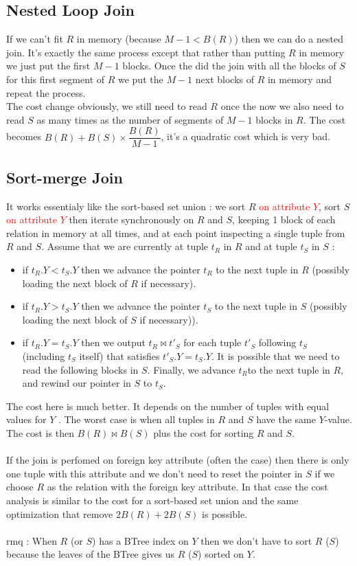 \documentclass[12pt,a4paper]{article}
\begin{document}
\subsection{Nested Loop Join}
If we can't fit $R$ in memory (because $M-1 < B(R)$) then we can do a nested join. It's exactly the same process except that rather than putting $R$ in memory we just put the first $M-1$ blocks. Once the did the join with all the blocks of $S$ for this first segment of $R$ we put the $M-1$ next blocks of $R$ in memory and repeat the process.\\
The cost change obviously, we still need to read $R$ once the now we also need to read $S$ as many times as the number of segments of $M-1$ blocks in $R$. The cost becomes $B(R) + B(S) \times \dfrac{B(R)}{M-1}$, it's a quadratic cost which is very bad.

\subsection{Sort-merge Join}
It works essentialy like the sort-based set union : we sort $R$ \textcolor{red}{on attribute $Y$}, sort $S$ \textcolor{red}{on attribute $Y$} then iterate synchronously on $R$ and $S$, keeping 1 block of each relation in memory at all times, and at each point inspecting a single tuple from $R$ and $S$. 
Assume that we are currently at tuple $t_R$ in $R$ and at tuple $t_S$ in $S$ : 
\begin{itemize}
\item if $t_R.Y < t_S.Y$ then we advance the pointer $t_R$ to the next tuple in $R$ (possibly loading the next block of $R$ if necessary).
\item if $t_R.Y > t_S.Y$ then we advance the pointer $t_S$ to the next tuple in $S$ (possibly loading the next block of $S$ if necessary)).
\item if $t_R.Y = t_S.Y$ then we output $t_R \Join t'_S$ for each tuple $t'_S$ following $t_S$ (including $t_S$ itself) that satisfies $t'_S.Y = t_S.Y$. It is possible that we need to read the following blocks in $S$. Finally, we advance $t_R $to the next tuple in $R$, and rewind our pointer in $S$ to $t_S$.
\end{itemize}
The cost here is much better. It depends on the number of tuples with equal values for $Y$ . The worst case is when all tuples in $R$ and $S$ have the same $Y $-value. The cost is then $B(R) \Join B(S)$ plus the cost for sorting $R$ and $S$.\\
\\
If the join is perfomed on foreign key attribute (often the case) then there is only one tuple with this attribute and we don't need to reset the pointer in $S$ if we choose $R$ as the relation with the foreign key attribute. In that case the cost analysis is similar to the cost for a sort-based set union and the same optimization that remove $2B(R) + 2B(S)$ is possible.\\
\\
rmq : When $R$ (or $S$) has a BTree index on $Y$ then we don't have to sort $R$ ($S$) because the leaves of the BTree gives us $R$ ($S$) sorted on $Y$.
\end{document}
